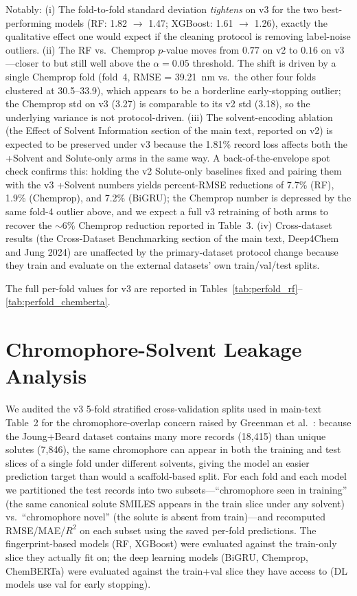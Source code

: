 \documentclass[journal=jcisd8,manuscript=suppinfo]{achemso}
\begin{document}
Notably:
(i) The fold-to-fold standard deviation \emph{tightens} on v3 for the two best-performing models (RF: 1.82 $\to$ 1.47; XGBoost: 1.61 $\to$ 1.26), exactly the qualitative effect one would expect if the cleaning protocol is removing label-noise outliers.
(ii) The RF vs.\ Chemprop $p$-value moves from $0.77$ on v2 to $0.16$ on v3---closer to but still well above the $\alpha = 0.05$ threshold. The shift is driven by a single Chemprop fold (fold~4, RMSE = 39.21~nm vs.\ the other four folds clustered at 30.5--33.9), which appears to be a borderline early-stopping outlier; the Chemprop std on v3 (3.27) is comparable to its v2 std (3.18), so the underlying variance is not protocol-driven.
(iii) The solvent-encoding ablation (the Effect of Solvent Information section of the main text, reported on v2) is expected to be preserved under v3 because the 1.81\% record loss affects both the +Solvent and Solute-only arms in the same way. A back-of-the-envelope spot check confirms this: holding the v2 Solute-only baselines fixed and pairing them with the v3 +Solvent numbers yields percent-RMSE reductions of 7.7\% (RF), 1.9\% (Chemprop), and 7.2\% (BiGRU); the Chemprop number is depressed by the same fold-4 outlier above, and we expect a full v3 retraining of both arms to recover the $\sim$6\% Chemprop reduction reported in Table~3.
(iv) Cross-dataset results (the Cross-Dataset Benchmarking section of the main text, Deep4Chem and Jung 2024) are unaffected by the primary-dataset protocol change because they train and evaluate on the external datasets' own train/val/test splits.

The full per-fold values for v3 are reported in Tables~\ref{tab:perfold_rf}--\ref{tab:perfold_chemberta}.


\section{Chromophore-Solvent Leakage Analysis}
\label{si:chromophore_leakage}

We audited the v3 5-fold stratified cross-validation splits used in main-text Table~2 for the chromophore-overlap concern raised by Greenman et al.~\cite{greenman2022multifidelity}: because the Joung+Beard dataset contains many more records (18{,}415) than unique solutes (7{,}846), the same chromophore can appear in both the training and test slices of a single fold under different solvents, giving the model an easier prediction target than would a scaffold-based split. For each fold and each model we partitioned the test records into two subsets---``chromophore seen in training'' (the same canonical solute SMILES appears in the train slice under any solvent) vs.\ ``chromophore novel'' (the solute is absent from train)---and recomputed RMSE/MAE/$R^2$ on each subset using the saved per-fold predictions. The fingerprint-based models (RF, XGBoost) were evaluated against the train-only slice they actually fit on; the deep learning models (BiGRU, Chemprop, ChemBERTa) were evaluated against the train+val slice they have access to (DL models use val for early stopping).
\end{document}
